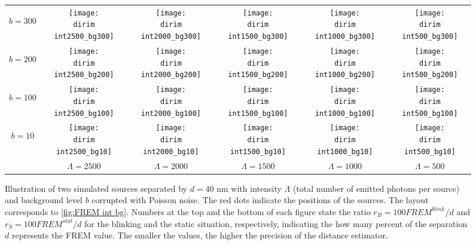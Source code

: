 \begin{figure}[!hbt]
	\centering
	\newcommand{\wf}{.15\textwidth}
	\newcommand{\dirim}{\qd gFREM/images/psf2/text_twosources_}
	\newcommand{\vs}{.4}
	\begin{tabular}{c|ccccc}
		\begin{sideways}\hspace{\vs cm}$b=300$\end{sideways}
		&\texttt{[image: \\dirim int2500\_bg300]}
		&\texttt{[image: \\dirim int2000\_bg300]}
		&\texttt{[image: \\dirim int1500\_bg300]}
		&\texttt{[image: \\dirim int1000\_bg300]}
		&\texttt{[image: \\dirim int500\_bg300]}\\
		\begin{sideways}\hspace{\vs cm}$b=200$\end{sideways}
		&\texttt{[image: \\dirim int2500\_bg200]}
		&\texttt{[image: \\dirim int2000\_bg200]}
		&\texttt{[image: \\dirim int1500\_bg200]}
		&\texttt{[image: \\dirim int1000\_bg200]}
		&\texttt{[image: \\dirim int500\_bg200]}\\
		\begin{sideways}\hspace{\vs cm}$b=100$\end{sideways}
		&\texttt{[image: \\dirim int2500\_bg100]}
		&\texttt{[image: \\dirim int2000\_bg100]}
		&\texttt{[image: \\dirim int1500\_bg100]}
		&\texttt{[image: \\dirim int1000\_bg100]}
		&\texttt{[image: \\dirim int500\_bg100]}\\
		\begin{sideways}\hspace{\vs cm}$b=10$\end{sideways}
		&\texttt{[image: \\dirim int2500\_bg10]}
		&\texttt{[image: \\dirim int2000\_bg10]}
		&\texttt{[image: \\dirim int1500\_bg10]}
		&\texttt{[image: \\dirim int1000\_bg10]}
		&\texttt{[image: \\dirim int500\_bg10]}\\
		\hline	
		&$\Lambda=2500$ & $\Lambda=2000$ & $\Lambda=1500$ & $\Lambda=1000$ & $\Lambda=500$\\
	\end{tabular}
	\caption{Illustration of two simulated sources separated by $d=40$ nm  with intensity $\Lambda$ (total number of emitted photons per source) and background level $b$ corrupted with Poisson noise. The red dots indicate the positions of the sources. The layout corresponds to \autoref{fig:FREM int bg}. Numbers at the top and the bottom of each figure state the ratio $r_B=100\unit{FREM}^{blink}/d$ and $r_S=100\unit{FREM}^{stat}/d$ for the blinking and the static situation, respectively, indicating the how many percent of the separation $d$ represents the FREM value. The smaller the values, the higher the precision of the distance estimator.}
	\label{fig:two sources int bg}
\end{figure}
